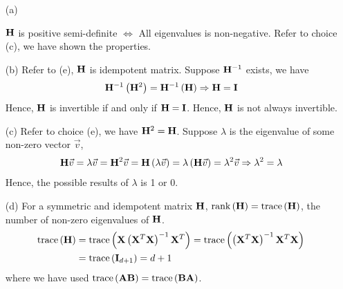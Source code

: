 \documentclass[12pt]{article}
\newcommand{\ParTh}[1]{\left(#1\right)}
\newcommand{\BF}[1]{{\bf#1}}
\newcommand{\Matrix}[2]{\ParTh{\begin{array}{#1}#2\end{array}}}
\begin{document}
\begin{enumerate}
	\item[(a)]

	$\BF{H}$ is positive semi-definite $\Leftrightarrow$ All eigenvalues is non-negative. Refer to choice (c), we have shown the properties.
	\item[(b)]
	Refer to (e), $\BF{H}$ is idempotent matrix. Suppose $\BF{H}^{-1}$ exists, we have
	\begin{align}
	\BF{H}^{-1}\ParTh{\BF{H}^2}=\BF{H}^{-1}\ParTh{\BF{H}}\Rightarrow\BF{H}=\BF{I}
	\end{align}
	Hence, $\BF{H}$ is invertible if and only if $\BF{H}=\BF{I}$. Hence, $\BF{H}$ is not always invertible.

	\item[(c)] Refer to choice (e), we have $\BF{H}^2=\BF{H}$. Suppose $\lambda$ is the eigenvalue of some non-zero vector $\vec{v}$,
	\begin{align}
	\BF{H}\vec{v}=\lambda\vec{v}=\BF{H}^2\vec{v}=\BF{H}\ParTh{\lambda\vec{v}}=\lambda\ParTh{\BF{H}\vec{v}}=\lambda^2\vec{v}\Rightarrow\lambda^2=\lambda
	\end{align}
	Hence, the possible results of $\lambda$ is 1 or 0.
	\item[(d)] For a symmetric and idempotent matrix $\BF{H}$, $\text{rank}\ParTh{\BF{H}}=\text{trace}\ParTh{\BF{H}}$, the
	number of non-zero eigenvalues of $\BF{H}$.
	\begin{align}
	\text{trace}\ParTh{\BF{H}}&=\text{trace}\ParTh{\BF{X}\ParTh{\BF{X}^T\BF{X}}^{-1}\BF{X}^T}=\text{trace}\ParTh{\ParTh{\BF{X}^T\BF{X}}^{-1}\BF{X}^T\BF{X}}\\
	&=\text{trace}\ParTh{\BF{I}_{d+1}}=d+1
	\end{align}
	where we have used $\text{trace}\ParTh{\BF{A}\BF{B}}=\text{trace}\ParTh{\BF{B}\BF{A}}$.
	

\end{enumerate}
\end{document}
